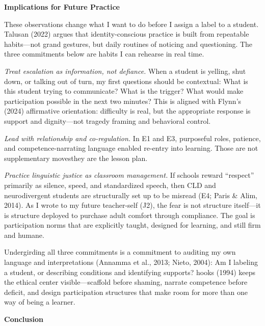 \documentclass[12pt]{article}
\newcommand{\apaheading}[1]{\begin{center}\textbf{#1}\end{center}}
\newcommand{\EvidenceSet}[1]{\textsc{E#1}}
\newcommand{\JournalArtifact}[1]{\textsc{J#1}}
\begin{document}
\newpage
\apaheading{Implications for Future Practice}

These observations change what I want to do before I assign a label to a student. Talusan (2022) argues that identity-conscious practice is built from repeatable habits---not grand gestures, but daily routines of noticing and questioning. The three commitments below are habits I can rehearse in real time.

\textit{Treat escalation as information, not defiance.} When a student is yelling, shut down, or talking out of turn, my first questions should be contextual: What is this student trying to communicate? What is the trigger? What would make participation possible in the next two minutes? This is aligned with Flynn's (2024) affirmative orientation: difficulty is real, but the appropriate response is support and dignity---not tragedy framing and behavioral control.

\textit{Lead with relationship and co-regulation.} In \EvidenceSet{1} and \EvidenceSet{3}, purposeful roles, patience, and competence-narrating language enabled re-entry into learning. Those are not supplementary moves\textemdash{}they are the lesson plan.

\textit{Practice linguistic justice as classroom management.} If schools reward ``respect'' primarily as silence, speed, and standardized speech, then CLD and neurodivergent students are structurally set up to be misread (\EvidenceSet{4}; Paris \& Alim, 2014). As I wrote to my future teacher-self (\JournalArtifact{2}), the fear is not structure itself---it is structure deployed to purchase adult comfort through compliance. The goal is participation norms that are explicitly taught, designed for learning, and still firm and humane.

Undergirding all three commitments is a commitment to auditing my own language and interpretations (Annamma et al., 2013; Nieto, 2004): Am I labeling a student, or describing conditions and identifying supports? hooks (1994) keeps the ethical center visible---scaffold before shaming, narrate competence before deficit, and design participation structures that make room for more than one way of being a learner.

\newpage
\apaheading{Conclusion}
\end{document}
